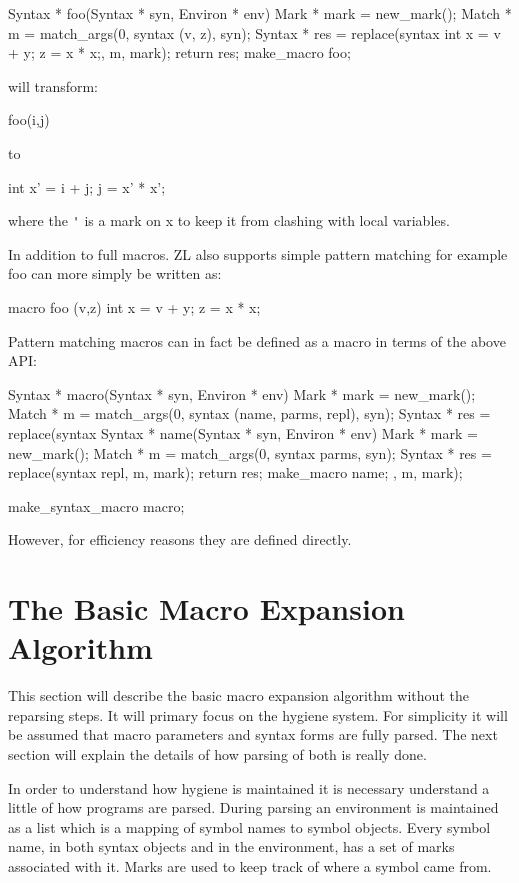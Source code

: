 \documentclass[12pt,english,letterpaper]{article}
\begin{document}
\begin{code}
Syntax * foo(Syntax * syn, Environ * env) {
  Mark * mark = new_mark();
  Match * m = match_args(0, syntax (v, z), syn);
  Syntax * res = replace(syntax {int x = v + y; z = x * x;}, m, mark);
  return res;
}
make_macro foo;
\end{code}

will transform:
\begin{code}
foo(i,j)
\end{code}
to
\begin{code}
int x' = i + j;
j = x' * x';
\end{code}
where the \verb/'/ is a mark on x to keep it from clashing with local variables.

In addition to full macros. ZL also supports simple pattern matching
for example foo can more simply be written as:

\begin{code}
macro foo (v,z) {
  int x = v + y; 
  z = x * x;
}
\end{code}

Pattern matching macros can in fact be defined as a macro in terms of
the above API:

\begin{code}
Syntax * macro(Syntax * syn, Environ * env) {
  Mark * mark = new_mark();
  Match * m = match_args(0, syntax (name, parms, repl), syn);
  Syntax * res = replace(syntax {
      Syntax * name(Syntax * syn, Environ * env) {
        Mark * mark = new_mark();
        Match * m = match_args(0, syntax parms, syn);
        Syntax * res = replace(syntax repl, m, mark);
        return res;
      }
      make_macro name;
    }, m, mark);
}

make_syntax_macro macro;
\end{code}

However, for efficiency reasons they are defined directly.

\section{The Basic Macro Expansion Algorithm}

This section will describe the basic macro expansion algorithm without
the reparsing steps.  It will primary focus on the hygiene system.
For simplicity it will be assumed that macro parameters and syntax
forms are fully parsed.  The next section will explain the details of
how parsing of both is really done.  

In order to understand how hygiene is maintained it is necessary
understand a little of how programs are parsed.  During parsing an
environment is maintained as a list which is a mapping of symbol names
to symbol objects.  Every symbol name, in both syntax objects and in
the environment, has a set of marks associated with it.  Marks are
used to keep track of where a symbol came from.
\end{document}
